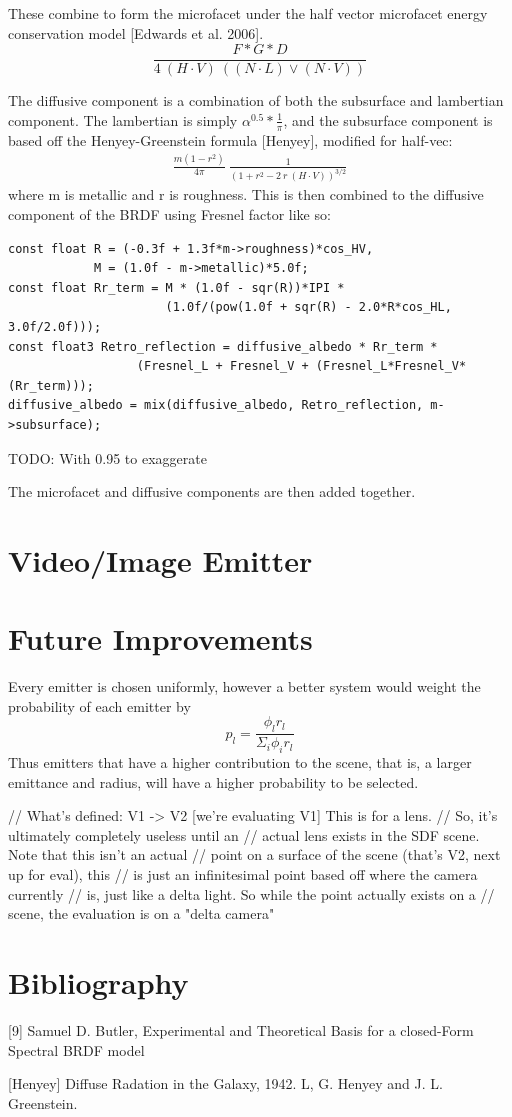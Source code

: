 \documentclass{article}
\begin{document}
  These combine to form the microfacet under the half vector microfacet energy
conservation model [Edwards et al. 2006].
  \[
  	\frac{F*G*D}{4 \: (H \cdot V) \: ( (N \cdot L) \vee (N \cdot V) )}
  \]
  
  The diffusive component is a combination of both the subsurface and lambertian
component. The lambertian is simply $\alpha^{0.5} * \frac{1}{\pi}$, and the
subsurface component is based off the Henyey-Greenstein formula [Henyey],
modified for half-vec:
  \begin{align}
  	\frac{m(1 - r^2)}{4\pi}\:\frac{1}{(1 + r^2 - 2\:r\:
  		(H \cdot V))^{3/2}}
  \end{align}
  where m is metallic and r is roughness. This is then combined to the diffusive
component of the BRDF using Fresnel factor like so:
  \begin{lstlisting}
const float R = (-0.3f + 1.3f*m->roughness)*cos_HV,
            M = (1.0f - m->metallic)*5.0f;
const float Rr_term = M * (1.0f - sqr(R))*IPI *
                      (1.0f/(pow(1.0f + sqr(R) - 2.0*R*cos_HL, 3.0f/2.0f)));
const float3 Retro_reflection = diffusive_albedo * Rr_term *
                  (Fresnel_L + Fresnel_V + (Fresnel_L*Fresnel_V*(Rr_term)));
diffusive_albedo = mix(diffusive_albedo, Retro_reflection, m->subsurface);

  \end{lstlisting}
  TODO: With 0.95 to exaggerate
  
  The microfacet and diffusive components are then added together.

  \section{Video/Image Emitter}

  \section{Future Improvements}

  Every emitter is chosen uniformly, however a better system would weight the
  probability of each emitter by
  \[
    p_l = \frac{\phi_lr_l}{\Sigma_i\phi_ir_l}
  \]
  Thus emitters that have a higher contribution to the scene, that is, a larger
  emittance and radius, will have a higher probability to be selected.

 
        // What's defined: V1 -> V2 [we're evaluating V1] This is for a lens.
        // So, it's ultimately completely useless until an
        // actual lens exists in the SDF scene. Note that this isn't an actual
        // point on a surface of the scene (that's V2, next up for eval), this
        // is just an infinitesimal point based off where the camera currently
        // is, just like a delta light. So while the point actually exists on a
        // scene, the evaluation is on a "delta camera"
  
  \section{Bibliography}
  [9]
  Samuel D. Butler, Experimental and Theoretical Basis for a closed-Form Spectral BRDF model
  
  [Henyey]
   Diffuse Radation in the Galaxy, 1942. L, G. Henyey and J. L. Greenstein. 
\end{document}

